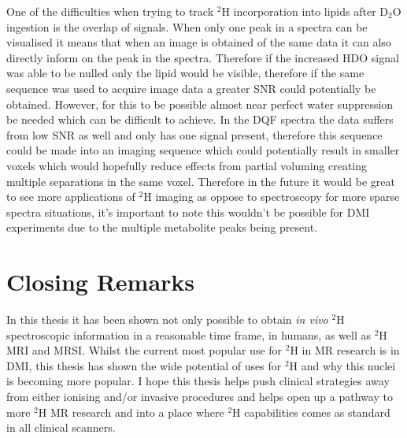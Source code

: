 One of the difficulties when trying to track $^2$H incorporation into lipids after D$_2$O ingestion is the overlap of signals. When only one peak in a spectra can be visualised it means that when an image is obtained of the same data it can also directly inform on the peak in the spectra. Therefore if the increased \ac{HDO} signal was able to be nulled only the lipid would be visible, therefore if the same sequence was used to acquire image data a greater \ac{SNR} could potentially be obtained. However, for this to be possible almost near perfect water suppression be needed which can be difficult to achieve. In the \ac{DQF} spectra the data suffers from low \ac{SNR} as well and only has one signal present, therefore this sequence could be made into an imaging sequence which could potentially result in smaller voxels which would hopefully reduce effects from partial voluming creating multiple separations in the same voxel. Therefore in the future it would be great to see more applications of $^2$H imaging as oppose to spectroscopy for more sparse spectra situations, it's important to note this wouldn't be possible for \ac{DMI} experiments due to the multiple metabolite peaks being present.

\section{Closing Remarks}

In this thesis it has been shown not only possible to obtain \textit{in vivo} $^2$H spectroscopic information in a reasonable time frame, in humans, as well as $^2$H \ac{MRI} and \ac{MRSI}. Whilst the current most popular use for $^2$H in MR research is in \ac{DMI}, this thesis has shown the wide potential of uses for $^2$H and why this nuclei is becoming more popular. I hope this thesis helps push clinical strategies away from either ionising and/or invasive procedures and helps open up a pathway to more $^2$H MR research and into a place where $^2$H capabilities comes as standard in all clinical scanners.